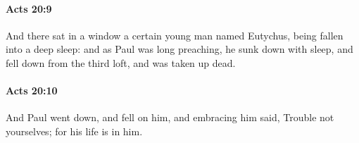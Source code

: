 		\paragraph{Acts 20:9} %
			\label{ACTS-20-9}

			And there sat in a window a certain young man named Eutychus, being fallen into a deep sleep: and as Paul was long preaching, he sunk down with sleep, and fell down from the third loft, and was taken up dead.

			\begin{framed}
			\scriptsize
				\begin{compactdesc}
					\item[SBLG] 
				\end{compactdesc}
			\end{framed}

		\paragraph{Acts 20:10} %
			\label{ACTS-20-10}

			And Paul went down, and fell on him, and embracing him said, Trouble not yourselves; for his life is in him.

